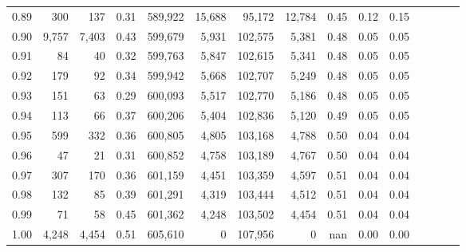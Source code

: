 \begin{tabular}{rrrcrrrrrrrrrrr}
0.89 &     300 &     137 &                                       0.31 &  589,922 &   15,688 &   95,172 &   12,784 &  0.45 &  0.12 &                         0.15 \\
0.90 &   9,757 &   7,403 &                                       0.43 &  599,679 &    5,931 &  102,575 &    5,381 &  0.48 &  0.05 &                         0.05 \\
0.91 &      84 &      40 &                                       0.32 &  599,763 &    5,847 &  102,615 &    5,341 &  0.48 &  0.05 &                         0.05 \\
0.92 &     179 &      92 &                                       0.34 &  599,942 &    5,668 &  102,707 &    5,249 &  0.48 &  0.05 &                         0.05 \\
0.93 &     151 &      63 &                                       0.29 &  600,093 &    5,517 &  102,770 &    5,186 &  0.48 &  0.05 &                         0.05 \\
0.94 &     113 &      66 &                                       0.37 &  600,206 &    5,404 &  102,836 &    5,120 &  0.49 &  0.05 &                         0.05 \\
0.95 &     599 &     332 &                                       0.36 &  600,805 &    4,805 &  103,168 &    4,788 &  0.50 &  0.04 &                         0.04 \\
0.96 &      47 &      21 &                                       0.31 &  600,852 &    4,758 &  103,189 &    4,767 &  0.50 &  0.04 &                         0.04 \\
0.97 &     307 &     170 &                                       0.36 &  601,159 &    4,451 &  103,359 &    4,597 &  0.51 &  0.04 &                         0.04 \\
0.98 &     132 &      85 &                                       0.39 &  601,291 &    4,319 &  103,444 &    4,512 &  0.51 &  0.04 &                         0.04 \\
0.99 &      71 &      58 &                                       0.45 &  601,362 &    4,248 &  103,502 &    4,454 &  0.51 &  0.04 &                         0.04 \\
1.00 &   4,248 &   4,454 &                                       0.51 &  605,610 &        0 &  107,956 &        0 &   nan &  0.00 &                         0.00 \\
\bottomrule
\end{tabular}
